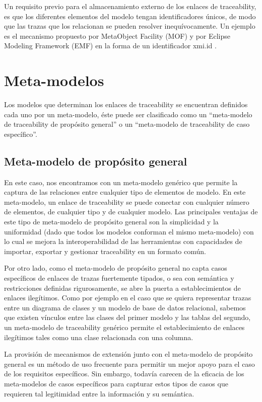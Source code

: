 \documentclass[a4paper,12pt,oneside]{book}
\begin{document}
Un requisito previo para el almacenamiento externo de los enlaces de traceability, es que los diferentes elementos del modelo tengan identificadores únicos, de modo que las trazas que los relacionan se pueden resolver inequívocamente. Un ejemplo es el mecanismo propuesto por MetaObject Facility (MOF) y por Eclipse Modeling Framework (EMF) en la forma de un identificador xmi.id .

\section{Meta-modelos}

Los modelos que determinan los enlaces de traceability se encuentran definidos cada uno por un meta-modelo, éste puede ser clasificado como un “meta-modelo de traceability de propósito general” o un “meta-modelo de traceability de caso específico”.

\subsection{Meta-modelo de propósito general}

En este caso, nos encontramos con un meta-modelo genérico que permite la captura de las relaciones entre cualquier tipo de elementos de modelo. En este meta-modelo, un enlace de traceability se puede conectar con cualquier número de elementos, de cualquier tipo y de cualquier modelo. Las principales ventajas de este tipo de meta-modelo de propósito general son la simplicidad y la uniformidad (dado que todos los modelos conforman el mismo meta-modelo) con lo cual se mejora la interoperabilidad de las herramientas con capacidades de importar, exportar y gestionar traceability en un formato común. 

Por otro lado, como el meta-modelo de propósito general no capta casos específicos de enlaces de trazas fuertemente tipados, o sea con semántica y restricciones definidas rigurosamente, se abre la puerta a establecimientos de enlaces ilegítimos. Como por ejemplo en el caso que se quiera representar trazas entre un diagrama de clases y un modelo de base de datos relacional, sabemos que existen vínculos entre las clases del primer modelo y las tablas del segundo, un meta-modelo de traceability genérico permite el establecimiento de enlaces ilegítimos tales como una clase relacionada con una columna. 

La provisión de mecanismos de extensión junto con el meta-modelo de propósito general es un método de uso frecuente para permitir un mejor apoyo para el caso de los requisitos específicos. Sin embargo, todavía carecen de la eficacia de los meta-modelos de casos específicos para capturar estos tipos de casos que requieren tal legitimidad entre la información y su semántica.
\end{document}

